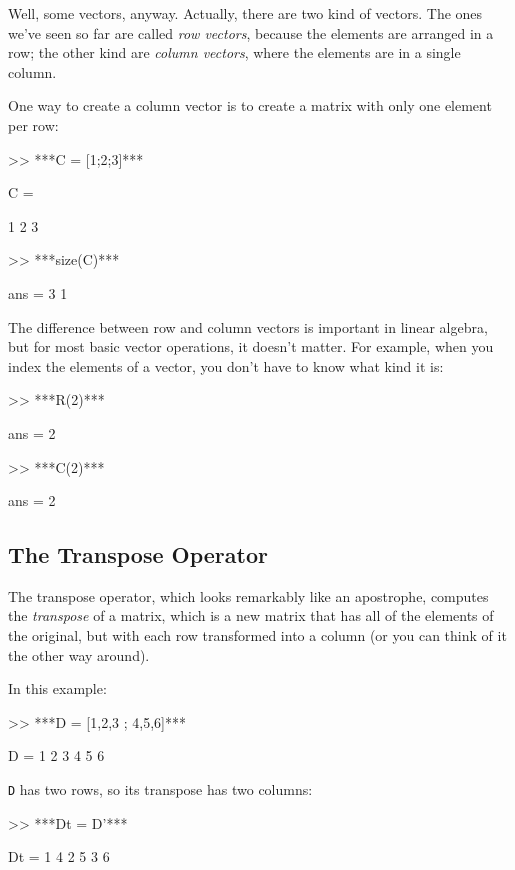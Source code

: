 Well, some vectors, anyway.  Actually, there are two kind
of vectors.  The ones we've seen so far are called {\em row vectors},
because the elements are arranged in a row; the other kind are
{\em column vectors}, where the elements are in a single column.

One way to create a column vector is to create a matrix with only
one element per row:

\begin{code}
>> ***C = [1;2;3]***

C =

     1
     2
     3

>> ***size(C)***

ans = 3     1
\end{code}

The difference between row and column vectors is important in
linear algebra, but for most basic vector operations, it doesn't matter.  
For example, when you index the elements of a vector, you don't have to know what kind
it is:


\begin{code}
>> ***R(2)***

ans = 2

>> ***C(2)***

ans = 2
\end{code}


\subsection{The Transpose Operator}

The transpose operator, which looks remarkably like an apostrophe,
computes the {\em transpose} of a matrix, which is a new matrix
that has all of the elements of the original, but with each row
transformed into a column (or you can think of it the other way around).


In this example:

\begin{code}
>> ***D = [1,2,3 ; 4,5,6]***

D =  1     2     3
     4     5     6
\end{code}

{\tt D} has two rows, so its transpose has two columns:

\begin{code}
>> ***Dt = D'***

Dt = 1     4
     2     5
     3     6
\end{code}

